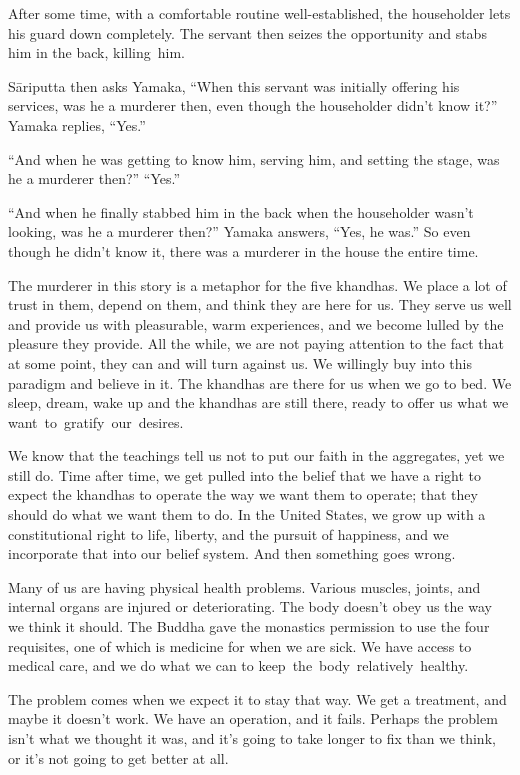 After some time, with a comfortable routine well-established, the householder lets his guard down completely. The servant then seizes the opportunity and stabs him in the back, \mbox{killing him.}

Sāriputta then asks Yamaka, ``When this servant was initially offering his services, was he a murderer then, even though the householder didn't know it?'' Yamaka replies, ``Yes.''

``And when he was getting to know him, serving him, and setting the stage, was he a murderer then?'' ``Yes.''

``And when he finally stabbed him in the back when the householder wasn't looking, was he a murderer then?'' Yamaka answers, ``Yes, he was.'' So even though he didn't know it, there was a murderer in the house the entire time.

The murderer in this story is a metaphor for the five khandhas. We place a lot of trust in them, depend on them, and think they are here for us. They serve us well and provide us with pleasurable, warm experiences, and we become lulled by the pleasure they provide. All the while, we are not paying attention to the fact that at some point, they can and will turn against us. We willingly buy into this paradigm and believe in it. The khandhas are there for us when we go to bed. We sleep, dream, wake up and the khandhas are still there, ready to offer us what we \mbox{want to gratify our desires.}

We know that the teachings tell us not to put our faith in the aggregates, yet we still do. Time after time, we get pulled into the belief that we have a right to expect the khandhas to operate the way we want them to operate; that they should do what we want them to do. In the United States, we grow up with a constitutional right to life, liberty, and the pursuit of happiness, and we incorporate that into our belief system. And then something goes wrong.

Many of us are having physical health problems. Various muscles, joints, and internal organs are injured or deteriorating. The body doesn't obey us the way we think it should. The Buddha gave the monastics permission to use the four requisites, one of which is medicine for when we are sick. We have access to medical care, and we do what we can to \mbox{keep the body relatively healthy.}

The problem comes when we expect it to stay that way. We get a treatment, and maybe it doesn't work. We have an operation, and it fails. Perhaps the problem isn't what we thought it was, and it's going to take longer to fix than we think, or it's not going to get better at all.

